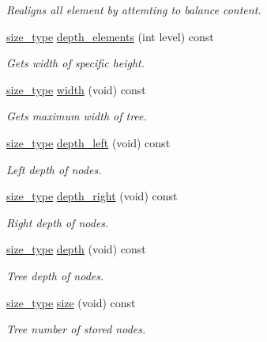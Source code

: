 \begin{DoxyCompactItemize}
\begin{DoxyCompactList}\small\item\em Realigns all element by attemting to balance content. \end{DoxyCompactList}\item 
\hyperlink{classcrap_1_1binary__tree_a7157228ff412e3fcf54a972120b7186a}{size\-\_\-type} \hyperlink{classcrap_1_1binary__tree_a38c23cd3df912134fd66fca2ed3a2785}{depth\-\_\-elements} (int level) const 
\begin{DoxyCompactList}\small\item\em Gets width of specific height. \end{DoxyCompactList}\item 
\hyperlink{classcrap_1_1binary__tree_a7157228ff412e3fcf54a972120b7186a}{size\-\_\-type} \hyperlink{classcrap_1_1binary__tree_abb92f673da94deb29bdde4f9b1f02fdb}{width} (void) const 
\begin{DoxyCompactList}\small\item\em Gets maximum width of tree. \end{DoxyCompactList}\item 
\hyperlink{classcrap_1_1binary__tree_a7157228ff412e3fcf54a972120b7186a}{size\-\_\-type} \hyperlink{classcrap_1_1binary__tree_ad9e970fc1c31b4c9bdbc0e6acbf999e6}{depth\-\_\-left} (void) const 
\begin{DoxyCompactList}\small\item\em Left depth of nodes. \end{DoxyCompactList}\item 
\hyperlink{classcrap_1_1binary__tree_a7157228ff412e3fcf54a972120b7186a}{size\-\_\-type} \hyperlink{classcrap_1_1binary__tree_a0ed9ad0859736021b6b8bf292a124e72}{depth\-\_\-right} (void) const 
\begin{DoxyCompactList}\small\item\em Right depth of nodes. \end{DoxyCompactList}\item 
\hyperlink{classcrap_1_1binary__tree_a7157228ff412e3fcf54a972120b7186a}{size\-\_\-type} \hyperlink{classcrap_1_1binary__tree_a97aaa62a77623d7bba5e3eed5979dcc5}{depth} (void) const 
\begin{DoxyCompactList}\small\item\em Tree depth of nodes. \end{DoxyCompactList}\item 
\hyperlink{classcrap_1_1binary__tree_a7157228ff412e3fcf54a972120b7186a}{size\-\_\-type} \hyperlink{classcrap_1_1binary__tree_aa7f7cbffae21219cfc6ca2f4a0dd9ade}{size} (void) const 
\begin{DoxyCompactList}\small\item\em Tree number of stored nodes. \end{DoxyCompactList}\end{DoxyCompactItemize}
